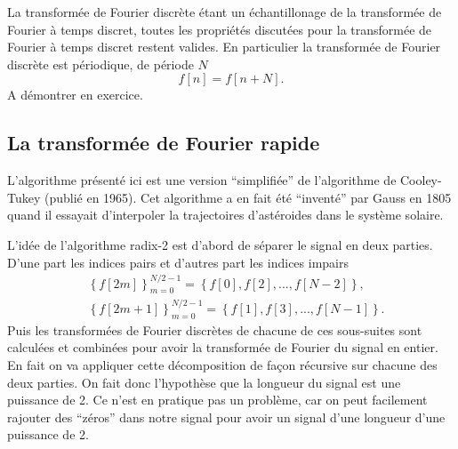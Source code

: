 \documentclass[a4paper,12pt]{book}
\begin{document}
La transformée de Fourier discrète étant un échantillonage de la transformée de Fourier 
à temps discret, toutes les propriétés discutées pour la transformée de Fourier à temps
discret restent valides. En particulier la transformée de Fourier discrète est périodique, de période $N$
\begin{equation}
 f[n]=f[n+N].
\end{equation}
A démontrer en exercice.


\subsection{La transformée de Fourier rapide}\label{subsec_tfr}

L'algorithme présenté ici est une version ``simplifiée'' de l'algorithme de Cooley-Tukey
(publié en 1965). Cet algorithme a en fait été ``inventé'' par Gauss en 1805 
quand il essayait d'interpoler la trajectoires d'astéroides dans le système solaire.

L'idée de l'algorithme radix-2 est d'abord de séparer le signal en deux parties. D'une part
les indices pairs et d'autres part les indices impairs
\begin{align}
 &\left\{f[2m]\right\}_{m=0}^{N/2-1}=\left\{f[0],f[2],...,f[N-2]\right\},\\
 &\left\{f[2m+1]\right\}_{m=0}^{N/2-1}=\left\{f[1],f[3],...,f[N-1]\right\}.
\end{align}
Puis les transformées de Fourier discrètes de chacune de ces sous-suites sont calculées 
et combinées pour avoir la transformée de Fourier du signal en entier. En fait on va 
appliquer cette décomposition de façon récursive sur chacune des deux parties. On fait donc
l'hypothèse que la longueur du signal est une puissance de 2. Ce n'est en pratique pas un problème, car on peut facilement rajouter des ``zéros'' dans notre signal pour 
avoir un signal d'une longueur d'une puissance de 2.
\end{document}
